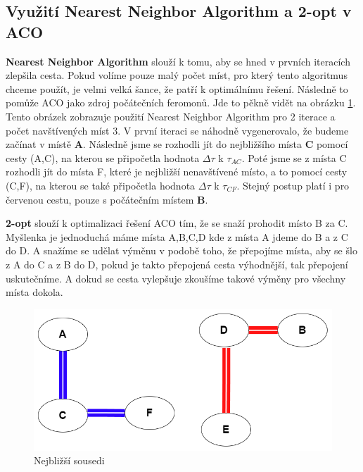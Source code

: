 \subsection{Využití Nearest Neighbor Algorithm a 2-opt v ACO} \label{sec:NNA 3opt in ACO}
\textbf{Nearest Neighbor Algorithm} slouží k tomu, aby se hned v prvních iteracích zlepšila cesta. Pokud volíme pouze malý počet míst, pro který tento algoritmus chceme použít, je velmi velká šance, že patří k optimálnímu řešení. Následně to pomůže ACO jako zdroj počátečních feromonů. Jde to pěkně vidět na obrázku \ref{fig:nn}. Tento obrázek zobrazuje použití Nearest Neighbor Algorithm pro 2 iterace a počet navštívených míst 3. V první iteraci se náhodně vygenerovalo, že budeme začínat v místě \textbf{A}. Následně jsme se rozhodli jít do nejbližšího místa \textbf{C} pomocí cesty (A,C), na kterou se připočetla hodnota $\Delta\tau$ k $\tau_{AC}$. Poté jsme se z místa C rozhodli jít do místa F, které je nejbližší nenavštívené místo, a to pomocí cesty (C,F), na kterou se také připočetla hodnota $\Delta\tau$ k $\tau_{CF}$. Stejný postup platí i pro červenou cestu, pouze s počátečním místem \textbf{B}.

\textbf{2-opt} slouží k optimalizaci řešení ACO tím, že se snaží prohodit místo B za C. Myšlenka je jednoduchá máme místa A,B,C,D kde z místa A jdeme do B a z C do D. A snažíme se udělat výměnu v podobě toho, že přepojíme místa, aby se šlo z A do C a z B do D, pokud je takto přepojená cesta výhodnější, tak přepojení uskutečníme. A dokud se cesta vylepšuje zkoušíme takové výměny pro všechny místa dokola. 

\begin{figure}[H]
\includegraphics[width=15cm]{obrazky-figures/nn.png}
\caption{Nejbližší sousedi}
\label{fig:nn}
\end{figure}
